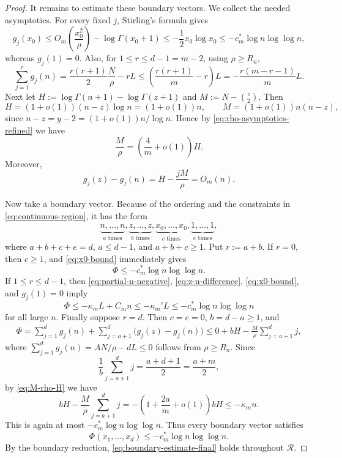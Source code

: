\documentclass[10pt,a4paper]{amsart}
\renewcommand\le{\leqslant}
\renewcommand\ge{\geqslant}
\begin{document}
\begin{proof}
It remains to estimate these boundary vectors. We collect the needed asymptotics. For every fixed $j$, Stirling's formula gives
\begin{equation}\label{eq:x0-bound}
        g_j(x_0)
        \le O_m\left(\frac{x_0^2}{\rho}\right)-\log\Gamma(x_0+1)
        \le -\frac12 x_0\log x_0
        \le -c_m^\ast\log n\log\log n,
\end{equation}
whereas $g_j(1)=0$. Also, for $1\le r\le d-1=m-2$, using $\rho\ge R_n$,
\begin{equation}\label{eq:partial-n-negative}
        \sum_{j=1}^r g_j(n)
        =\frac{r(r+1)}2\frac{N}{\rho}-rL
        \le \left(\frac{r(r+1)}m-r\right)L
        =-\frac{r(m-r-1)}mL .
\end{equation}
Next let $H:=\log\Gamma(n+1)-\log\Gamma(z+1)$ and $M:=N-\binom z2$. Then
\begin{equation}\label{eq:H-M-asymptotics}
        H=(1+o(1))(n-z)\log n=(1+o(1))n,
        \qquad
        M=(1+o(1))n(n-z),
\end{equation}
since $n-z=y-2=(1+o(1))n/\log n$. Hence by \eqref{eq:rho-asymptotics-refined} we have
\begin{equation}\label{eq:M-rho-H}
\frac M\rho=\left(\frac4m+o(1)\right)H.
\end{equation}
Moreover,
\begin{equation}\label{eq:z-n-difference}
        g_j(z)-g_j(n)=H-\frac{jM}{\rho}=O_m(n).
\end{equation}

Now take a boundary vector. Because of the ordering and the constraints in \eqref{eq:continuous-region}, it has the form
\[
        \underbrace{n,\ldots,n}_{a\text{ times}},
        \underbrace{z,\ldots,z}_{b\text{ times}},
        \underbrace{x_0,\ldots,x_0}_{c\text{ times}},
        \underbrace{1,\ldots,1}_{e\text{ times}},
\]
where $a+b+c+e=d$, $a\le d-1$, and $a+b+c\ge1$. Put $r:=a+b$. If $r=0$, then $c\ge1$, and \eqref{eq:x0-bound} immediately gives
\[
\Phi\le -c_m^\ast\log n\log\log n.
\]
If $1\le r\le d-1$, then \eqref{eq:partial-n-negative}, \eqref{eq:z-n-difference}, \eqref{eq:x0-bound}, and $g_j(1)=0$ imply
\[
        \Phi
        \le -\kappa_m L+C_m n
        \le -\kappa_m' L
        \le -c_m^\ast\log n\log\log n
\]
for all large $n$. Finally suppose $r=d$. Then $c=e=0$, $b=d-a\ge1$, and
\begin{align*}
\Phi=\sum_{j=1}^d g_j(n)+\sum_{j=a+1}^d\bigl(g_j(z)-g_j(n)\bigr)    \le 0+bH-\frac{M}{\rho}\sum_{j=a+1}^d j,
\end{align*}
where $\sum_{j=1}^d g_j(n)=AN/\rho-dL\le0$ follows from $\rho\ge R_n$. Since $$\frac1b\sum_{j=a+1}^d j=\frac{a+d+1}{2}=\frac{a+m}{2},$$
by \eqref{eq:M-rho-H} we have
\[
bH-\frac{M}{\rho}\sum_{j=a+1}^d j
=-\left(1+\frac{2a}{m}+o(1)\right)bH
\le -\kappa_m n.
\]
This is again at most $-c_m^\ast\log n\log\log n$. Thus every boundary vector satisfies
\begin{equation}\label{eq:boundary-estimate-final}
        \Phi(x_1,\ldots,x_d)
        \le -c_m^\ast\log n\log\log n .
\end{equation}
By the boundary reduction, \eqref{eq:boundary-estimate-final} holds throughout $\mathcal R$.


\end{proof}
\end{document}

